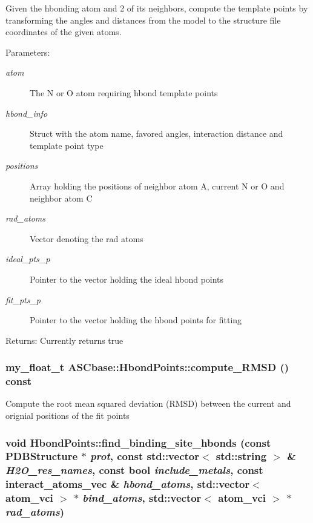 Given the hbonding atom and 2 of its neighbors, compute the template points by transforming the angles and distances from the model to the structure file coordinates of the given atoms.

\begin{Desc}
\item[Parameters:]
\begin{description}
\item[{\em atom}]The N or O atom requiring hbond template points \item[{\em hbond\_\-info}]Struct with the atom name, favored angles, interaction distance and template point type \item[{\em positions}]Array holding the positions of neighbor atom A, current N or O and neighbor atom C \item[{\em rad\_\-atoms}]Vector denoting the rad atoms \item[{\em ideal\_\-pts\_\-p}]Pointer to the vector holding the ideal hbond points \item[{\em fit\_\-pts\_\-p}]Pointer to the vector holding the hbond points for fitting \end{description}
\end{Desc}
\begin{Desc}
\item[Returns:]Currently returns true \end{Desc}
\subsubsection{\setlength{\rightskip}{0pt plus 5cm}my\_\-float\_\-t ASCbase::Hbond\-Points::compute\_\-RMSD () const\hspace{0.3cm}{\tt  [inline]}}\label{classASCbase_1_1HbondPoints_ff599a0e97c9b535f644765f8a63be1f}


Compute the root mean squared deviation (RMSD) between the current and orignial positions of the fit points 
\subsubsection{\setlength{\rightskip}{0pt plus 5cm}void Hbond\-Points::find\_\-binding\_\-site\_\-hbonds (const \bf{PDBStructure} $\ast$ {\em prot}, const std::vector$<$ std::string $>$ \& {\em H2O\_\-res\_\-names}, const bool {\em include\_\-metals}, const interact\_\-atoms\_\-vec \& {\em hbond\_\-atoms}, std::vector$<$ atom\_\-vci $>$ $\ast$ {\em bind\_\-atoms}, std::vector$<$ atom\_\-vci $>$ $\ast$ {\em rad\_\-atoms})}\label{classASCbase_1_1HbondPoints_4ac75a890a38f90de37bd4793da50fef}


